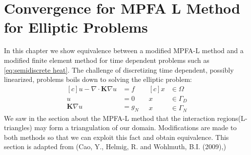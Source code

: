 \documentclass[../Main/main.tex]{subfiles}
\begin{document}
	\chapter{Convergence for MPFA L Method for Elliptic Problems}
	\graphicspath{{../Equivalence between MPFA-L and FEM/figs/}}
	In this chapter we show equivalence between a modified MPFA-L method and a modified finite element method for time dependent problems such as  \eqref{eq:semidiscrete heat}. The challenge of discretizing time dependent, possibly linearized, problems boils down to solving the elliptic problem:
	\begin{equation}\label{eq:stationary_heat}
		\begin{aligned}[c]
		u - \nabla \cdot \pmb{K} \nabla u &= f \\
			u &= 0 \\
			\pmb{K}\nabla u &= g_N
		\end{aligned}
		\ \ \
		\begin{aligned}[c]
			x &\in \Omega  \\
			x &\in  \Gamma_D \\
			x &\in \Gamma_N 
		\end{aligned}
	\end{equation}
	We saw in the section about the MPFA-L method that the interaction regions(L-triangles) may form a triangulation of our domain.
	Modifications are made to both methods so that we can exploit this fact and obtain equivalence. This section is adapted from (Cao, Y., Helmig, R. and Wohlmuth, B.I. (2009),\cite{https://doi.org/10.1002/num.20525})
\end{document}
